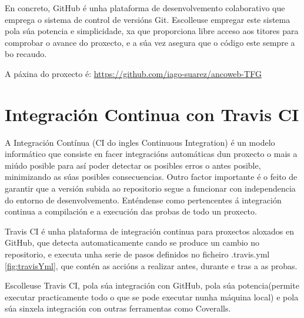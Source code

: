     En concreto, GitHub é unha plataforma de desenvolvemento colaborativo que emprega o sistema de
    control de versións Git. Escolleuse empregar este sistema pola súa potencia e simplicidade, xa
    que proporciona libre acceso aos titores para comprobar o avance do proxecto, e a súa vez asegura
    que o código este sempre a bo recaudo.
    
    A páxina do proxecto é: \url{https://github.com/iago-suarez/ancoweb-TFG} 
    
\section{Integración Continua con Travis CI}

    A Integración Contínua (CI do ingles Continuous Integration) é un modelo informático que 
    consiste en facer integracións automáticas dun proxecto o mais a miúdo posible para así 
    poder detectar os posibles erros o antes posible, minimizando as súas posibles consecuencias.
    Outro factor importante é o feito de garantir que a versión subida ao repositorio segue a
    funcionar con independencia do entorno de desenvolvemento. Enténdense como pertencentes á 
    integración continua a compilación e a execución das probas de todo un proxecto.
    
    Travis CI é unha plataforma de integración continua para proxectos aloxados en GitHub, que 
    detecta automaticamente cando se produce un cambio no repositorio, e executa unha serie de pasos 
    definidos no ficheiro .travis.yml \ref{fig:travisYml}, que contén as accións a realizar 
    antes, durante e tras a as probas.
    
    Escolleuse Travis CI, pola súa integración con GitHub, pola súa potencia(permite executar 
    practicamente todo o que se pode executar nunha máquina local) e pola súa sinxela integración
    con outras ferramentas como Coveralls.
    
